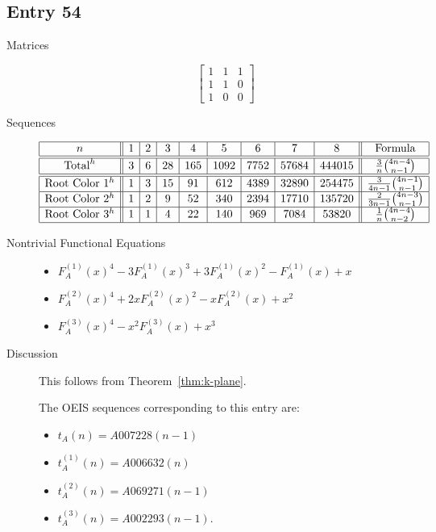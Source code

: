 \documentclass[12pt]{amsart}
\newcommand{\gff}[2]{F_{#2}^{(#1)}(x)}
\newcommand{\gfa}[1]{\gff{#1}{A}}
\begin{document}
\subsection*{Entry 54}
\begin{description}
    \item[Matrices]
    
    \[\begin{bmatrix}
1 & 1 & 1 \\
1 & 1 & 0 \\
1 & 0 & 0
\end{bmatrix}\]
    \item[Sequences]\hspace*{\fill}\vspace{-0.5cm}
    \begin{center}
        \[
        \begin{array}{|c||c|c|c|c|c|c|c|c||c|}\hline
           n  & 1 & 2 & 3 & 4 & 5 & 6 & 7 & 8  & \text{Formula}\\\hline\hline
           \text{Total}^{h}  & 3 & 6 & 28 & 165 & 1092 & 7752 & 57684 & 444015 & 
           \frac{3}{n}\binom{4n-4}{n-1}\\\hline\hline
           \text{Root Color }1^h & 1 & 3 & 15 & 91 & 612 & 4389 & 32890 & 254475 & 
           \frac{3}{4n-1}\binom{4n-1}{n-1}\\\hline
           \text{Root Color }2^h & 1 & 2 & 9 & 52 & 340 & 2394 & 17710 & 135720 & 
           \frac{2}{3n-1}\binom{4n-3}{n-1}\\\hline
           \text{Root Color }3^h & 1 & 1 & 4 & 22 & 140 & 969 & 7084 & 53820 & 
           \frac{1}{n}\binom{4n-4}{n-2}\\\hline
        \end{array}
        \]
    \end{center}
    
    \item[Nontrivial Functional Equations]\hspace*{\fill}

    \begin{itemize}
\item $\gfa{1}^4-3\gfa{1}^3+3\gfa{1}^2-\gfa{1}+x$


\item $\gfa{2}^4+2x\gfa{2}^2-x\gfa{2}+x^2$


\item $\gfa{3}^4-x^2\gfa{3}+x^3$


\end{itemize}
    \item[Discussion] This follows from Theorem~\ref{thm:k-plane}.

    The OEIS sequences corresponding to this entry are:
    \begin{itemize}
        \item $t_A(n)=A007228(n-1)$
        \item $t_A^{(1)}(n)=A006632(n)$
        \item $t_A^{(2)}(n)=A069271(n-1)$
        \item $t_A^{(3)}(n)=A002293(n-1)$.
    \end{itemize}
\end{description}
\end{document}
